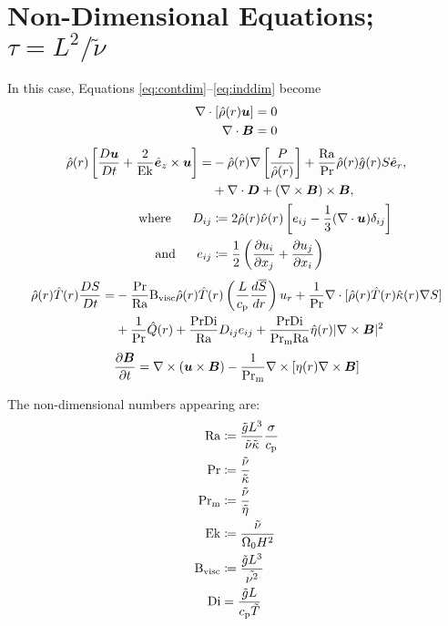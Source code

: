 \documentclass[12pt]{article}
\numberwithin{equation}{section}
\newcommand{\rhond}{\hat{\rho}}
\newcommand{\tmpnd}{\hat{T}}
\newcommand{\gnd}{\hat{g}}
\newcommand{\nund}{\hat{\nu}}
\newcommand{\kappand}{\hat{\kappa}}
\newcommand{\etand}{\hat{\eta}}
\begin{document}
	\section{Non-Dimensional Equations; $\tau=L^2/\tilde{\nu}$}
	In this case, Equations \eqref{eq:contdim}--\eqref{eq:inddim} become 
	\begin{align}
	\Div[\rhond\ofr\vecu] &= 0\label{eq:contndvisc}\\
	\Div \vecb &= 0
\end{align}
\begin{subequations}\label{eq:momndvisc}
	\begin{align}
		\rhond\ofr\left[\matderiv{\vecu}+\frac{2}{\ek}\ez\times\vecu\right] = &-\rhond\ofr\nabla\left[ \frac{P}{\rhond\ofr} \right] + \frac{\ra}{\pr}\rhond\ofr\gnd\ofr S\er, \nonumber\\
		&+\Div\bm{D} +(\curl\vecb)\times\vecb,\\
		\where D_{ij} &\define 2\rhond\ofr\nund\ofr \left[e_{ij} - \frac{1}{3}(\Div\vecu) \delta_{ij} \right]\\
		\andd e_{ij} &\define \frac{1}{2}\left(\pderiv{u_i}{x_j} + \pderiv{u_j}{x_i} \right)
	\end{align}
\end{subequations}
\begin{align}\label{eq:enndvisc}
	\rhond\ofr\tmpnd\ofr \matderiv{S} = &- \frac{\pr}{\ra}\bvisc\rhond\ofr\tmpnd\ofr \left(\frac{L}{\cp}\frac{d\sref}{dr}\right) \ur + \frac{1}{\pr} \Div[\rhond\ofr \tmpnd\ofr \kappand\ofr \nabla S] \nonumber \\
	&+ \frac{1}{\pr} \hat{Q}(r) + \frac{\pr\di}{\ra} D_{ij}e_{ij} + \frac{\pr\di}{\prm\ra} \etand\ofr|\curl\vecb|^2
\end{align}
\begin{align}\label{eq:indndvisc}
	\frac{\partial\bm{B}}{\partial t} = \nabla\times(\bm{u}\times\bm{B}) - \frac{1}{{\rm{Pr_m}}} \nabla\times[\eta(r)\nabla\times\bm{B}]
\end{align}	

The non-dimensional numbers appearing are:
\begin{subequations}
\begin{align}
	{\rm{Ra}} &\coloneqq \frac{\tilde{g} L^3}{\tilde{\nu} \tilde{\kappa}} \frac{\sigma}{c_{\rm{p}}}\\ 
	{\rm{Pr}} &\coloneqq \frac{\tilde{\nu}}{\tilde{\kappa}}\\
	{\rm{Pr_m}} &\coloneqq \frac{\tilde{\nu}}{\tilde{\eta}}\\
	{\rm{Ek}} &\coloneqq \frac{\tilde{\nu}}{\Omega_0H^2}\\	
	{\rm{B_{visc}}} &\coloneqq \frac{\tilde{g}L^3}{\tilde{\nu^2}}\\
	{\rm{Di}} &= \frac{\tilde{g}L}{c_{\rm{p}}\tilde{T}}
\end{align}
\end{subequations}
\end{document}
